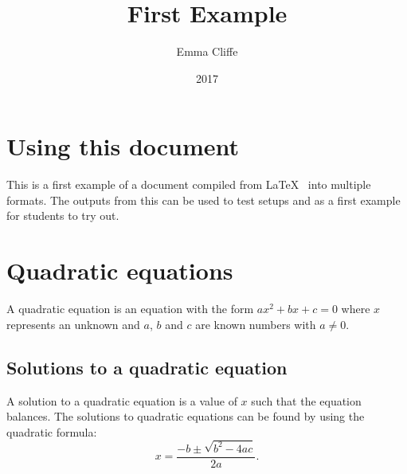 \documentclass[12pt,a4paper]{article}
\title{First Example}
\author{Emma Cliffe}
\date{2017}
\theoremstyle{clearprint}
\begin{document}
\maketitle

\tableofcontents
\listoffigures
\listoftables
\newpage

\setcounter{page}{1}

\section*{Using this document}

This is a first example of a document compiled from \LaTeX~ into multiple formats. The outputs from this can be used to test setups and as a first example for students to try out. 

\newpage
\section{Quadratic equations}

A quadratic equation is an equation with the form \(ax^2 + bx + c = 0\) where \(x\) represents an unknown and \(a\), \(b\) and \(c\) are known numbers with \(a \neq 0\). 

\subsection{Solutions to a quadratic equation}

A solution to a quadratic equation is a value of \(x\) such that the equation balances. The solutions to quadratic equations can be found by using the quadratic formula: 
\begin{equation}
\label{quadform}
x = \frac{-b \pm \sqrt{b^2-4ac}}{2a}.
\end{equation}
\end{document}
